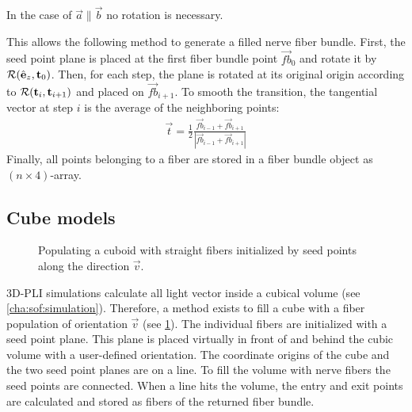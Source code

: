 % 
In the case of $\vec{a} \parallel \vec{b}$ no rotation is necessary.
\par
% 
This allows the following method to generate a filled nerve fiber bundle.
First, the seed point plane is placed at the first fiber bundle point $\vec{fb}_0$ and rotate it by $\mathcal{R}(\hat{\mathbf{e}}_z, \mathbf{t}_0)$.
Then, for each step, the plane is rotated at its original origin according to $\mathcal{R}(\mathbf{t}_i, \mathbf{t}_{i+1})$ and placed on $\vec{fb}_{i+1}$.
To smooth the transition, the tangential vector at step $i$ is the average of the neighboring points:
\begin{align}
    \vec{t} = \frac{1}{2} \frac{\vec{fb}_{i-1} + \vec{fb}_{i+1}}{|\vec{fb}_{i-1} + \vec{fb}_{i+1}|}
\end{align}
%
Finally, all points belonging to a fiber are stored in a fiber bundle object as $(n \times 4)$-array.
%
%
%
\subsection{Cube models} \label{sec:cubeModelBuilding}
%
\begin{figure}[!t]
    \centering
    \setlength{\tikzwidth}{0.5\textwidth}
	\caption{Populating a cuboid with straight fibers initialized by seed points along the direction $\vec{v}$.}
    \label{fig:cubeBuild}%
\end{figure}
%
\ac{3D-PLI} simulations calculate all light vector inside a cubical volume (see \cref{cha:sof:simulation}).
Therefore, a method exists to fill a cube with a fiber population of orientation $\vec{v}$ (see \cref{fig:cubeBuild}).
The individual fibers are initialized with a seed point plane.
This plane is placed virtually in front of and behind the cubic volume with a user-defined orientation.
The coordinate origins of the cube and the two seed point planes are on a line.
To fill the volume with nerve fibers the seed points are connected.
When a line hits the volume, the entry and exit points are calculated and stored as fibers of the returned fiber bundle.
%
%
%
